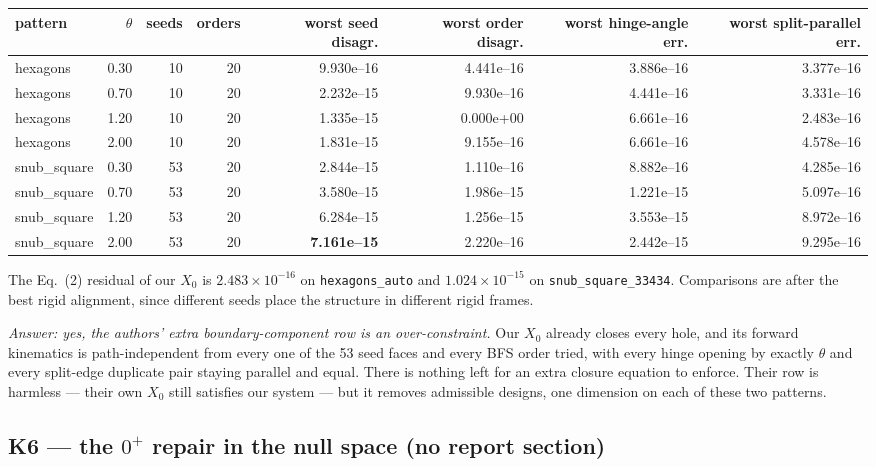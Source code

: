 \documentclass[10pt,a4paper]{article}
\newcommand{\fn}[1]{\nolinkurl{#1}}
\begin{document}
\begin{center}\footnotesize
\begin{tabular}{@{}lrrrrrrr@{}}
\toprule
pattern & $\theta$ & seeds & orders & worst seed disagr. & worst order disagr. & worst hinge-angle err. & worst split-parallel err. \\
\midrule
hexagons & 0.30 & 10 & 20 & 9.930e--16 & 4.441e--16 & 3.886e--16 & 3.377e--16 \\
hexagons & 0.70 & 10 & 20 & 2.232e--15 & 9.930e--16 & 4.441e--16 & 3.331e--16 \\
hexagons & 1.20 & 10 & 20 & 1.335e--15 & 0.000e+00 & 6.661e--16 & 2.483e--16 \\
hexagons & 2.00 & 10 & 20 & 1.831e--15 & 9.155e--16 & 6.661e--16 & 4.578e--16 \\
snub\_square & 0.30 & 53 & 20 & 2.844e--15 & 1.110e--16 & 8.882e--16 & 4.285e--16 \\
snub\_square & 0.70 & 53 & 20 & 3.580e--15 & 1.986e--15 & 1.221e--15 & 5.097e--16 \\
snub\_square & 1.20 & 53 & 20 & 6.284e--15 & 1.256e--15 & 3.553e--15 & 8.972e--16 \\
snub\_square & 2.00 & 53 & 20 & \textbf{7.161e--15} & 2.220e--16 & 2.442e--15 & 9.295e--16 \\
\bottomrule
\end{tabular}
\end{center}

The Eq.~(2) residual of our $X_0$ is $2.483\times10^{-16}$ on \fn{hexagons_auto} and
$1.024\times10^{-15}$ on \fn{snub_square_33434}. Comparisons are after the best rigid alignment,
since different seeds place the structure in different rigid frames.

\emph{Answer: yes, the authors' extra boundary-component row is an over-constraint.} Our $X_0$
already closes every hole, and its forward kinematics is path-independent from every one of the
53 seed faces and every BFS order tried, with every hinge opening by exactly $\theta$ and every
split-edge duplicate pair staying parallel and equal. There is nothing left for an extra closure
equation to enforce. Their row is harmless --- their own $X_0$ still satisfies our system --- but
it removes admissible designs, one dimension on each of these two patterns.

\subsection{K6 --- the $0^+$ repair in the null space (no report section)}
\end{document}
